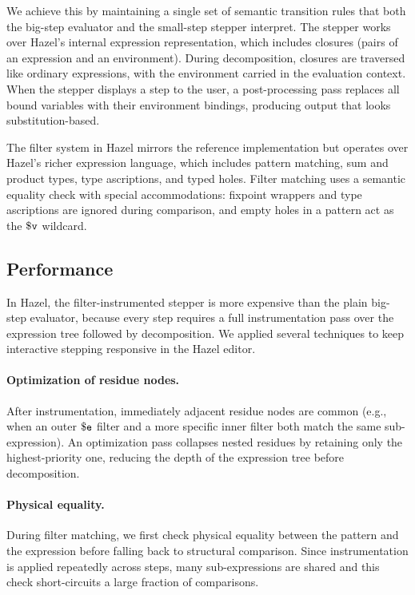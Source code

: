 We achieve this by maintaining a single set of semantic transition
rules that both the big-step evaluator and the small-step stepper
interpret. The stepper works over Hazel's internal expression
representation, which includes closures (pairs of an expression and
an environment). During decomposition, closures are traversed like
ordinary expressions, with the environment carried in the evaluation
context. When the stepper displays a step to the user, a
post-processing pass replaces all bound variables with their
environment bindings, producing output that looks substitution-based.

The filter system in Hazel mirrors the reference implementation but
operates over Hazel's richer expression language, which includes
pattern matching, sum and product types, type ascriptions, and typed
holes. Filter matching uses a semantic equality check with special
accommodations: fixpoint wrappers and type ascriptions are ignored
during comparison, and empty holes in a pattern act as the
\(\mathtt{\$v}\) wildcard.

\subsection{Performance}\label{sec:impl-perf}

In Hazel, the filter-instrumented stepper is more expensive than the
plain big-step evaluator, because every step requires a full
instrumentation pass over the expression tree followed by
decomposition. We applied several techniques to keep interactive
stepping responsive in the Hazel editor.

\paragraph{Optimization of residue nodes.}
After instrumentation, immediately adjacent residue nodes are common
(e.g., when an outer \(\mathtt{\$e}\) filter and a more specific inner
filter both match the same sub-expression). An optimization pass
collapses nested residues by retaining only the highest-priority one,
reducing the depth of the expression tree before decomposition.

\paragraph{Physical equality.}
During filter matching, we first check physical equality between the
pattern and the expression before falling back to structural
comparison. Since instrumentation is applied repeatedly across steps,
many sub-expressions are shared and this check short-circuits a large
fraction of comparisons.

